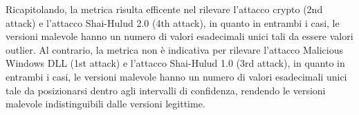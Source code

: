 Ricapitolando, 
la metrica risulta efficente nel rilevare l'attacco crypto (2nd attack) e l'attacco Shai-Hulud 2.0 (4th attack),
in quanto in entrambi i casi, le versioni malevole hanno un numero di valori esadecimali unici tali da
essere valori outlier.
Al contrario, la metrica non è indicativa per rilevare l'attacco Malicious Windows DLL (1st attack) e l'attacco Shai-Hulud 1.0 (3rd attack),
in quanto in entrambi i casi, le versioni malevole hanno un numero di valori esadecimali unici tale da posizionarsi dentro agli intervalli di confidenza,
rendendo le versioni malevole indistinguibili dalle versioni legittime.

